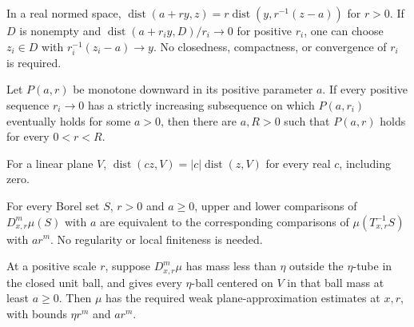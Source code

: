 \begin{lemma}
\label{lem:rescaled-distance-selection}

In a real normed space, $\operatorname{dist}(a+ry,z)=r\operatorname{dist}(y,r^{-1}(z-a))$ for $r>0$. If $D$ is nonempty and $\operatorname{dist}(a+r_i y,D)/r_i\to0$ for positive $r_i$, one can choose $z_i\in D$ with $r_i^{-1}(z_i-a)\to y$. No closedness, compactness, or convergence of $r_i$ is required.
\end{lemma}

\begin{lemma}
\label{lem:sequential-uniform-scale}

Let $P(a,r)$ be monotone downward in its positive parameter $a$. If every positive sequence $r_i\to0$ has a strictly increasing subsequence on which $P(a,r_i)$ eventually holds for some $a>0$, then there are $a,R>0$ such that $P(a,r)$ holds for every $0<r<R$.
\end{lemma}

\begin{lemma}
\label{lem:plane-distance-homogeneous}

For a linear plane $V$, $\operatorname{dist}(cz,V)=|c|\operatorname{dist}(z,V)$ for every real $c$, including zero.
\end{lemma}

\begin{lemma}
\label{lem:dimensional-blowup-set-estimates}

For every Borel set $S$, $r>0$ and $a\geq0$, upper and lower comparisons of $D^m_{x,r}\mu(S)$ with $a$ are equivalent to the corresponding comparisons of $\mu(T_{x,r}^{-1}S)$ with $ar^m$. No regularity or local finiteness is needed.
\end{lemma}

\begin{lemma}
\label{lem:weak-approximation-scale-transfer}

At a positive scale $r$, suppose $D^m_{x,r}\mu$ has mass less than $\eta$ outside the $\eta$-tube in the closed unit ball, and gives every $\eta$-ball centered on $V$ in that ball mass at least $a\geq0$. Then $\mu$ has the required weak plane-approximation estimates at $x,r$, with bounds $\eta r^m$ and $ar^m$.
\end{lemma}


